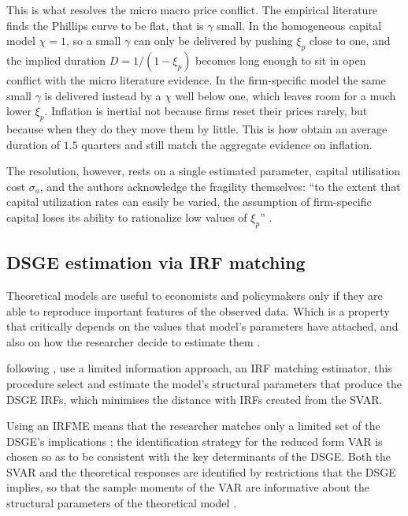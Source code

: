 \documentclass[12pt, a4paper]{article}
\begin{document}
This is what resolves the micro macro price conflict. The
empirical literature finds the Phillips curve to be flat, that is $\gamma$ small. In the
homogeneous capital model $\chi = 1$, so a small $\gamma$ can only be delivered by pushing
$\xi_p$ close to one, and the implied duration $D = 1/(1-\xi_p)$ becomes long enough to sit
in open conflict with the micro literature evidence. In the firm-specific model the same
small $\gamma$ is delivered instead by a $\chi$ well below one, which leaves room for a much
lower $\xi_p$. Inflation is inertial not because firms reset their prices rarely, but because
when they do they move them by little. This is how \citet{ACEL2005WP} obtain an average
duration of $1.5$ quarters and still match the aggregate evidence on inflation.

The resolution, however, rests on a single estimated parameter, capital utilisation cost $\sigma_a$, and 
the authors acknowledge the fragility themselves: ``to the extent that capital utilization rates can
easily be varied, the assumption of firm-specific capital loses its ability to rationalize
low values of $\xi_p$'' \citep[p.~227]{ACEL2011}.

\subsection{DSGE estimation via IRF matching}
Theoretical models are useful to economists and policymakers only if they are able to reproduce important
features of the observed data. Which is a property that critically depends on the values that model's 
parameters have attached, and also on how the researcher decide to estimate them \citep{Theodoridis2011}.

\citet{ACEL2005WP} following \citet{RotembergWoodford1997, CEE2005, Iacoviello2005, BoivinGiannoni2006},
use a limited information approach, an IRF matching estimator, 
this procedure select and estimate the model's structural parameters that produce the DSGE IRFs, which
minimises the distance with IRFs created from the SVAR. 

Using an IRFME means that the researcher matches only a limited set of the DSGE's implications \citep{Giacomini2013};
the identification strategy for the reduced form VAR is chosen so as to be consistent with the key determinants
of the DSGE. Both the SVAR and the theoretical responses are identified by restrictions that the DSGE implies, 
so that the sample moments of the VAR are informative about the structural parameters of the theoretical 
model \citep{Hall_Inoue_Nason_Rossi2012}.
\end{document}
